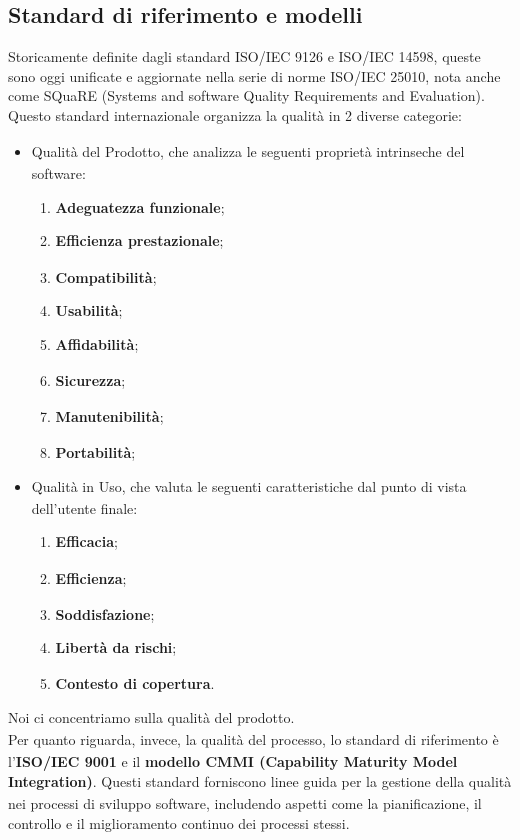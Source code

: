 \documentclass[a4paper,11pt]{article}
\newcommand{\G}{\textsubscript{\scalebox{0.6}{\textbf{G}}}}
\begin{document}
\subsection{Standard di riferimento e modelli}
Storicamente definite dagli standard ISO/IEC 9126 e ISO/IEC 14598, queste sono oggi unificate e aggiornate nella serie di norme ISO/IEC 25010, nota anche come SQuaRE (Systems and software Quality Requirements and Evaluation). Questo standard internazionale organizza la qualità\G{} in 2 diverse categorie: 
\begin{itemize}
    \item Qualità\G{} del Prodotto\G{}, che analizza le seguenti proprietà intrinseche del software:
    \begin{enumerate}
        \item \textbf{Adeguatezza funzionale};
        \item \textbf{Efficienza\G{} prestazionale};
        \item \textbf{Compatibilità};
        \item \textbf{Usabilità};
        \item \textbf{Affidabilità\G{}};
        \item \textbf{Sicurezza\G{}};
        \item \textbf{Manutenibilità\G{}};
        \item \textbf{Portabilità};
    \end{enumerate}
    \item Qualità\G{} in Uso, che valuta le seguenti caratteristiche dal punto di vista dell'utente finale:
    \begin{enumerate}
        \item \textbf{Efficacia\G{}};
        \item \textbf{Efficienza\G{}};
        \item \textbf{Soddisfazione};
        \item \textbf{Libertà da rischi\G{}};
        \item \textbf{Contesto di copertura}.
    \end{enumerate}
\end{itemize}
Noi ci concentriamo sulla qualità\G{} del prodotto\G{}. \\
Per quanto riguarda, invece, la qualità\G{} del processo, lo standard di riferimento è l'\textbf{ISO/IEC 9001} e il \textbf{modello CMMI (Capability Maturity Model Integration)}. Questi standard forniscono linee guida per la gestione della qualità\G{} nei processi di sviluppo software, includendo aspetti come la pianificazione, il controllo e il miglioramento continuo dei processi stessi.
\end{document}
